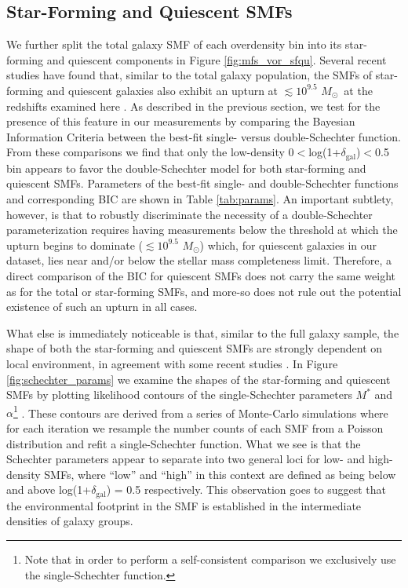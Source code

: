 \documentclass[a4paper,fleqn,usenatbib]{mnras}
\def\msol{$M_{\odot}$}
\begin{document}
\subsection{Star-Forming and Quiescent SMFs}


We further split the total galaxy SMF of each overdensity bin into its star-forming and quiescent components in Figure \ref{fig:mfs_vor_sfqu}.
Several recent studies have found that, similar to the total galaxy population, the SMFs of star-forming and quiescent galaxies also exhibit an upturn at $\lesssim 10^{9.5}$ \msol\ at the redshifts examined here \citep[e.g.][]{Drory2009, Muzzin2013a, Tomczak2014, Mortlock2015}.
As described in the previous section, we test for the presence of this feature in our measurements by comparing the Bayesian Information Criteria between the best-fit single- versus double-Schechter function.
From these comparisons we find that only the low-density 0$<$log(1+$\delta_{\mathrm{gal}}$)$<$0.5 bin appears to favor the double-Schechter model for both star-forming and quiescent SMFs.
Parameters of the best-fit single- and double-Schechter functions and corresponding BIC are shown in Table \ref{tab:params}.
An important subtlety, however, is that to robustly discriminate the necessity of a double-Schechter parameterization requires having measurements below the threshold at which the upturn begins to dominate ($\lesssim 10^{9.5}$ \msol) which, for quiescent galaxies in our dataset, lies near and/or below the stellar mass completeness limit.
Therefore, a direct comparison of the BIC for quiescent SMFs does not carry the same weight as for the total or star-forming SMFs, and more-so does not rule out the potential existence of such an upturn in all cases.


What else is immediately noticeable is that, similar to the full galaxy sample, the shape of both the star-forming and quiescent SMFs are strongly dependent on local environment, in agreement with some recent studies \citep{Vulcani2012, Davidzon2016}.
In Figure \ref{fig:schechter_params} we examine the shapes of the star-forming and quiescent SMFs by plotting likelihood contours of the single-Schechter parameters $M^*$ and $\alpha$\footnote{Note that in order to perform a self-consistent comparison we exclusively use the single-Schechter function.
}
.
These contours are derived from a series of Monte-Carlo simulations where for each iteration we resample the number counts of each SMF from a Poisson distribution and refit a single-Schechter function.
What we see is that the Schechter parameters appear to separate into two general loci for low- and high-density SMFs, where ``low'' and ``high'' in this context are defined as being below and above log(1+$\delta_{\mathrm{gal}}$) = 0.5 respectively.
This observation goes to suggest that the environmental footprint in the SMF is established in the intermediate densities of galaxy groups.
\end{document}
